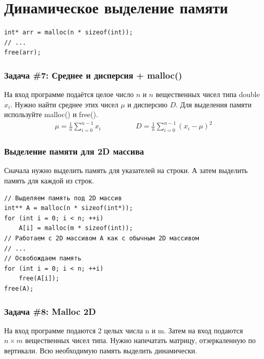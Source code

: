 \documentclass{article}
\begin{document}
\newpage

\section*{Динамическое выделение памяти}
\begin{lstlisting}
int* arr = malloc(n * sizeof(int));
// ...  
free(arr);
\end{lstlisting}
\subsubsection*{\Squarepipe \quad Задача \#7: Среднее и дисперсия + malloc()}
На вход программе подаётся целое число $n$ и $n$ вещественных чисел типа double ${x_i}$. Нужно найти среднее этих чисел $\mu$ и дисперсию $D$. Для выделения памяти используйте malloc() и free(). 
\begin{align*}
  \mu = \frac{1}{n}\sum_{i=0}^{n-1}x_i & \quad \quad \quad \quad D = \frac{1}{n}\sum_{i=0}^{n-1}(x_i - \mu)^2
\end{align*}

\subsubsection*{Выделение памяти для 2D массива}
Сначала нужно выделить память для указателей на строки. А затем выделить память для каждой из строк.
\begin{lstlisting}
// Выделяем память под 2D массив
int** A = malloc(n * sizeof(int*));
for (int i = 0; i < n; ++i)
	A[i] = malloc(m * sizeof(int));
// Работаем с 2D массивом A как с обычным 2D массивом
// ...  
// Освобождаем память
for (int i = 0; i < n; ++i)
	free(A[i]);
free(A);
\end{lstlisting}

\subsubsection*{\Squarepipe \quad Задача \#8: Malloc 2D}
На вход программе подаются 2 целых числа n и m. Затем на вход подаются $n \times m$ вещественных чисел типа. Нужно напечатать матрицу, отзеркаленную по вертикали. Всю необходимую память выделить динамически.
\end{document}
